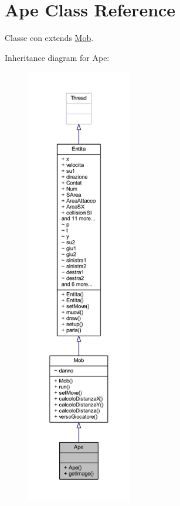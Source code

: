 \hypertarget{class_entita_1_1_ape}{}\section{Ape Class Reference}
\label{class_entita_1_1_ape}


Classe con extends \hyperlink{class_entita_1_1_mob}{Mob}.  




Inheritance diagram for Ape\+:
\nopagebreak
\begin{figure}[H]
\begin{center}
\leavevmode
\includegraphics[height=550pt]{class_entita_1_1_ape__inherit__graph}
\end{center}
\end{figure}


